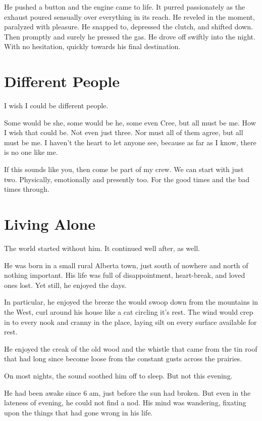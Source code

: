 \documentclass[fontsize=12pt,english]{scrreprt}
\begin{document}
He pushed a button and the engine came to life. It purred passionately
as the exhaust poured sensually over everything in its reach. He
reveled in the moment, paralyzed with pleasure. He snapped to,
depressed the clutch, and shifted down. Then promptly and surely he
pressed the gas. He drove off swiftly into the night. With no
hesitation, quickly towards his final destination.

\newpage

\section{Different People}

I wish I could be different people.

Some would be she, some would be he, some even Cree, but all must be
me. How I wish that could be. Not even just three. Nor must all of
them agree, but all must be me. I haven't the heart to let anyone see,
because as far as I know, there is no one like me.

If this sounds like you, then come be part of my crew. We can start
with just two. Physically, emotionally and presently too. For the good
times and the bad times through.

\newpage

\section{Living Alone}

The world started without him. It continued well after, as well.

He was born in a small rural Alberta town, just south of nowhere and
north of nothing important. His life was full of disappointment,
heart-break, and loved ones lost. Yet still, he enjoyed the days.

In particular, he enjoyed the breeze the would swoop down from the
mountains in the West, curl around his house like a cat circling it's
rest. The wind would crep in to every nook and cranny in the place,
laying silt on every surface available for rest.

He enjoyed the creak of the old wood and the whistle that came from
the tin roof that had long since become loose from the constant gusts
across the prairies.

On most nights, the sound soothed him off to sleep. But not this evening.

He had been awake since 6 am, just before the sun had broken. But even
in the lateness of evening, he could not find a nod. His mind was
wandering, fixating upon the things that had gone wrong in his life.
\end{document}

